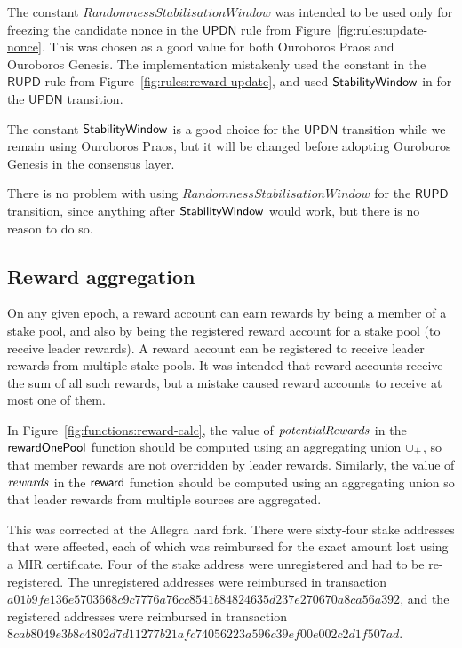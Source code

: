The constant $RandomnessStabilisationWindow$ was intended to be used only
for freezing the candidate nonce in the $\mathsf{UPDN}$ rule
from Figure~\ref{fig:rules:update-nonce}.
This was chosen as a good value for both Ouroboros Praos and Ouroboros Genesis.
The implementation mistakenly used the constant in the $\mathsf{RUPD}$ rule
from Figure~\ref{fig:rules:reward-update}, and used $\mathsf{StabilityWindow}$
in for the $\mathsf{UPDN}$ transition.

The constant $\mathsf{StabilityWindow}$ is a good choice for the $\mathsf{UPDN}$
transition while we remain using Ouroboros Praos, but it will be changed before
adopting Ouroboros Genesis in the consensus layer.

There is no problem with using $RandomnessStabilisationWindow$ for the
$\mathsf{RUPD}$ transition, since anything after $\mathsf{StabilityWindow}$ would work,
but there is no reason to do so.

\subsection{Reward aggregation}
\label{sec:errata:reward-aggregation}

On any given epoch, a reward account can earn rewards by being a member of a stake pool,
and also by being the registered reward account for a stake pool (to receive leader rewards).
A reward account can be registered to receive leader rewards from multiple stake pools.
It was intended that reward accounts receive the sum of all such rewards,
but a mistake caused reward accounts to receive at most one of them.

In Figure~\ref{fig:functions:reward-calc}, the value of $\mathit{potentialRewards}$ in the
$\mathsf{rewardOnePool}$ function should be computed using an aggregating union
$\mathbin{\cup_{+}}$, so that member rewards are not overridden by leader rewards.
Similarly, the value of $\mathit{rewards}$ in the $\mathsf{reward}$ function should be computed
using an aggregating union so that leader rewards from multiple sources are aggregated.

This was corrected at the Allegra hard fork.
There were sixty-four stake addresses that were affected,
each of which was reimbursed for the exact amount lost using a MIR certificate.
Four of the stake address were unregistered and had to be re-registered.
The unregistered addresses were reimbursed in transaction
\newline
$a01b9fe136e5703668c9c7776a76cc8541b84824635d237e270670a8ca56a392$,
and the registered addresses were reimbursed in transaction
\newline
$8cab8049e3b8c4802d7d11277b21afc74056223a596c39ef00e002c2d1f507ad$.

